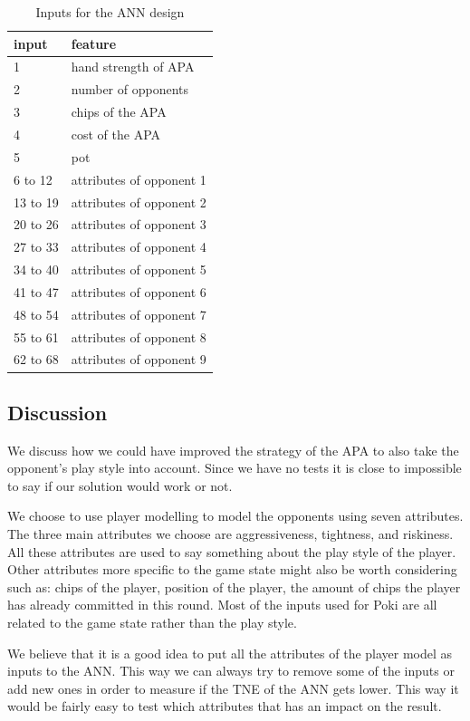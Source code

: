 \begin{table}[H]
\center
\begin{tabular}{ | l | l | }
\hline
input & feature \\
\hline
1 & hand strength of APA\\
2 & number of opponents\\
3 & chips of the APA\\
4 & cost of the APA\\
5 & pot\\
6 to 12 & attributes of opponent 1\\
13 to 19 & attributes of opponent 2\\
20 to 26 & attributes of opponent 3\\
27 to 33 & attributes of opponent 4\\
34 to 40 & attributes of opponent 5\\
41 to 47 & attributes of opponent 6\\
48 to 54 & attributes of opponent 7\\
55 to 61 & attributes of opponent 8\\
62 to 68 & attributes of opponent 9\\
\hline
\end{tabular}
\caption{Inputs for the ANN design \label{tab:ann-design}}
\end{table} 

\subsection{Discussion}
We discuss how we could have improved the strategy of the APA to also take the opponent's play style into account. Since we have no tests it is close to impossible to say if our solution would work or not.

We choose to use player modelling to model the opponents using seven attributes. The three main attributes we choose are aggressiveness, tightness, and riskiness. All these attributes are used to say something about the play style of the player. Other attributes more specific to the game state might also be worth considering such as: chips of the player, position of the player, the amount of chips the player has already committed in this round.
Most of the inputs used for Poki are all related to the game state rather than the play style. 

We believe that it is a good idea to put all the attributes of the player model as inputs to the ANN. This way we can always try to remove some of the inputs or add new ones in order to measure if the TNE of the ANN gets lower. This way it would be fairly easy to test which attributes that has an impact on the result. 

